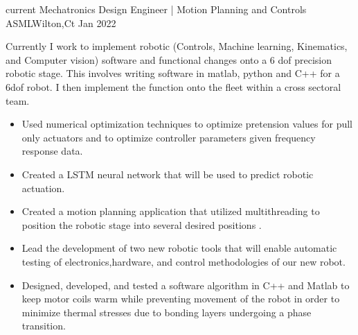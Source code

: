 \begin{experiences}

\experience
  {current}      {Mechatronics Design Engineer |  Motion Planning and Controls }{ASML}{Wilton,Ct}
  {Jan 2022} {
                  Currently I work to implement robotic (Controls, Machine learning, Kinematics, and Computer vision) software and functional changes onto a 6 dof precision robotic stage. This involves writing software in matlab, python and C++ for a 6dof robot. I then implement the function onto the fleet within a cross sectoral team. 
			\begin{itemize}
		\item Used numerical optimization techniques to optimize pretension  values for pull only actuators and to optimize controller parameters given frequency response data.
		    \item Created a LSTM neural network that will be used to predict robotic actuation.
                       \item Created a motion planning application that utilized multithreading to position the robotic stage into several desired positions .
		    \item Lead the development of two new robotic tools that will enable automatic testing of electronics,hardware, and control methodologies of our new robot.
		 \item Designed, developed, and tested a software algorithm in C++ and Matlab to keep motor coils warm while preventing movement of the robot in order to minimize thermal stresses due to bonding layers undergoing a phase transition.
		

\end{itemize}}
\end{experiences}

